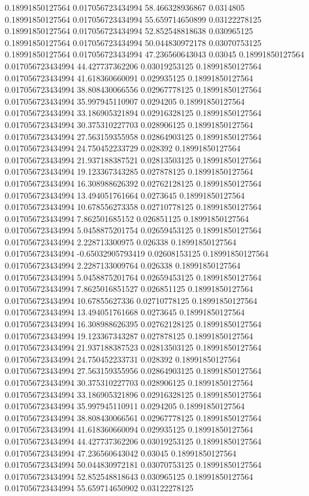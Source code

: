 0.18991850127564 0.017056723434994 58.466328936867 0.0314805
0.18991850127564 0.017056723434994 55.659714650899 0.03122278125
0.18991850127564 0.017056723434994 52.852548818638 0.030965125
0.18991850127564 0.017056723434994 50.044830972178 0.03070753125
0.18991850127564 0.017056723434994 47.236560643043 0.03045
0.18991850127564 0.017056723434994 44.427737362206 0.03019253125
0.18991850127564 0.017056723434994 41.618360660091 0.029935125
0.18991850127564 0.017056723434994 38.808430066556 0.02967778125
0.18991850127564 0.017056723434994 35.997945110907 0.0294205
0.18991850127564 0.017056723434994 33.186905321894 0.02916328125
0.18991850127564 0.017056723434994 30.375310227703 0.028906125
0.18991850127564 0.017056723434994 27.563159355958 0.02864903125
0.18991850127564 0.017056723434994 24.750452233729 0.028392
0.18991850127564 0.017056723434994 21.937188387521 0.02813503125
0.18991850127564 0.017056723434994 19.123367343285 0.027878125
0.18991850127564 0.017056723434994 16.308988626392 0.02762128125
0.18991850127564 0.017056723434994 13.494051761664 0.0273645
0.18991850127564 0.017056723434994 10.678556273358 0.02710778125
0.18991850127564 0.017056723434994 7.862501685152 0.026851125
0.18991850127564 0.017056723434994 5.0458875201754 0.02659453125
0.18991850127564 0.017056723434994 2.228713300975 0.026338
0.18991850127564 0.017056723434994 -0.65032905793419 0.02608153125
0.18991850127564 0.017056723434994 2.2287133009764 0.026338
0.18991850127564 0.017056723434994 5.0458875201764 0.02659453125
0.18991850127564 0.017056723434994 7.8625016851527 0.026851125
0.18991850127564 0.017056723434994 10.67855627336 0.02710778125
0.18991850127564 0.017056723434994 13.494051761668 0.0273645
0.18991850127564 0.017056723434994 16.308988626395 0.02762128125
0.18991850127564 0.017056723434994 19.123367343287 0.027878125
0.18991850127564 0.017056723434994 21.937188387523 0.02813503125
0.18991850127564 0.017056723434994 24.750452233731 0.028392
0.18991850127564 0.017056723434994 27.563159355956 0.02864903125
0.18991850127564 0.017056723434994 30.375310227703 0.028906125
0.18991850127564 0.017056723434994 33.186905321896 0.02916328125
0.18991850127564 0.017056723434994 35.997945110911 0.0294205
0.18991850127564 0.017056723434994 38.808430066561 0.02967778125
0.18991850127564 0.017056723434994 41.618360660094 0.029935125
0.18991850127564 0.017056723434994 44.427737362206 0.03019253125
0.18991850127564 0.017056723434994 47.236560643042 0.03045
0.18991850127564 0.017056723434994 50.044830972181 0.03070753125
0.18991850127564 0.017056723434994 52.852548818643 0.030965125
0.18991850127564 0.017056723434994 55.659714650902 0.03122278125
